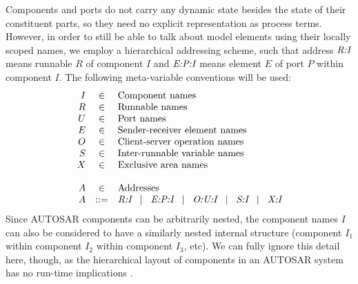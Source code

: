\documentclass[twocolumn]{article}
\newcommand{\adr}[1]{\emph{#1}}
\newcommand{\sep}{\hspace{2ex}|\hspace{2ex}}
\begin{document}
Components and ports do not carry any dynamic state besides the state of their constituent parts, so they need no explicit representation as process terms. However, in order to still be able to talk about model elements using their locally scoped names, we employ a hierarchical addressing scheme, such that address $\adr{R:I}$ means runnable $R$ of component $I$ and $\adr{E:P:I}$ means element $E$ of port $P$ within component $I$. The following meta-variable conventions will be used:
%
\[
\begin{array}{rcll}
	I	& \in		& \text{Component names} \\
	R	& \in		& \text{Runnable names} \\
	U	& \in		& \text{Port names} \\
	E	& \in		& \text{Sender-receiver element names} \\
	O	& \in		& \text{Client-server operation names} \\
	S	& \in		& \text{Inter-runnable variable names} \\
	X	& \in		& \text{Exclusive area names} \\
	\\
	A	& \in		& \text{Addresses} \\
	A	& ::=		& \adr{R:I}   \sep   \adr{E:P:I}   \sep   \adr{O:U:I}   \sep   \adr{S:I}   \sep   \adr{X:I}   \\
\end{array}
\]
%
Since AUTOSAR components can be arbitrarily nested, the component names $I$ can also be considered to have a similarly nested internal structure (component $I_1$ within component $I_2$ within component $I_3$, etc). We can fully ignore this detail here, though, as the hierarchical layout of components in an AUTOSAR system has no run-time implications \cite{TODO2}.
\end{document}

